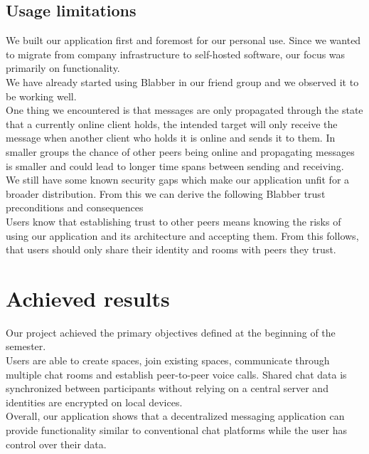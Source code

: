 \documentclass{article} %
\begin{document}
\subsection{Usage limitations}
We built our application first and foremost for our personal use. Since we wanted to migrate from company infrastructure to self-hosted software, our focus was primarily on functionality.\\
We have already started using Blabber in our friend group and we observed it to be working well.\\
One thing we encountered is that messages are only propagated through the state that a currently online client holds, the intended target will only receive the message when another client who holds it is online and sends it to them. In smaller groups the chance of other peers being online and propagating messages is smaller and could lead to longer time spans between sending and receiving. \\
We still have some known security gaps which make our application unfit for a broader distribution.
From this we can derive the following Blabber trust preconditions and consequences\\
Users know that establishing trust to other peers means knowing the risks of using our application and its architecture and accepting them. From this follows, that users should only share their identity and rooms with peers they trust.

\section{Achieved results}
Our project achieved the primary objectives defined at the beginning of the semester.
\\
Users are able to create spaces, join existing spaces, communicate through multiple chat rooms and establish peer-to-peer voice calls. Shared chat data is synchronized between participants without relying on a central server and identities are encrypted on local devices.
\\
Overall, our application shows that a decentralized messaging application can provide functionality similar to conventional chat platforms while the user has control over their data.
\newpage
\end{document}
